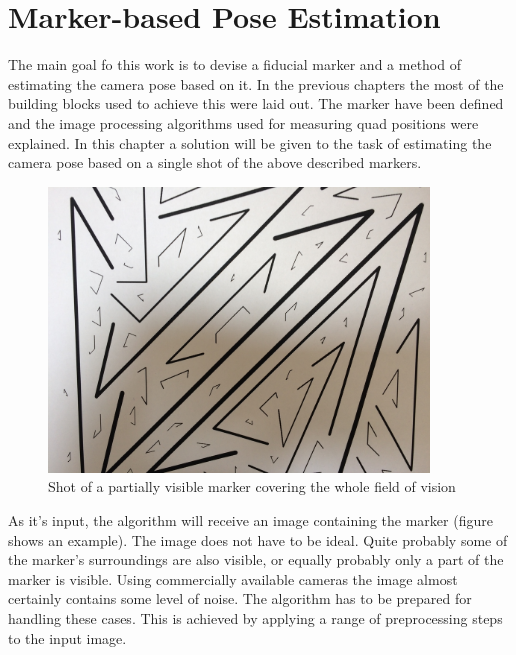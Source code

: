\chapter{Marker-based Pose Estimation}\label{sect:marker_recognition}

The main goal fo this work is to devise a fiducial marker and a method of estimating the camera pose based on it.
In the previous chapters the most of the building blocks used to achieve this were laid out.
The marker have been defined and the image processing algorithms used for measuring quad positions were explained.
In this chapter a solution will be given to the task of estimating the camera pose based on a single shot of the above described markers.

\begin{figure}[ht]
	\centering
	\includegraphics[width=0.9\textwidth]{figures/marker_full.JPG}
	\caption{Shot of a partially visible marker covering the whole field of vision}
	\label{fig:markerFull}
\end{figure}

As it's input, the algorithm will receive an image containing the marker (figure  shows an example).
The image does not have to be ideal.
Quite probably some of the marker's surroundings are also visible, or equally probably only a part of the marker is visible.
Using commercially available cameras the image almost certainly contains some level of noise.
The algorithm has to be prepared for handling these cases.
This is achieved by applying a range of preprocessing steps to the input image.


